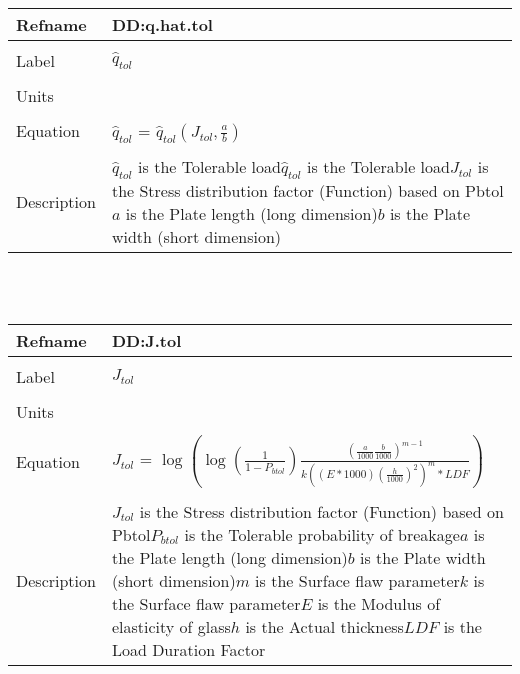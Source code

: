 \documentclass[12pt]{article}
\begin{document}
~\newline
\noindent \begin{minipage}{\textwidth}
\begin{tabular}{p{} p{}}
\toprule \textbf{Refname} & \textbf{DD:q.hat.tol}
\label{DD:q.hat.tol}
\\ \midrule \\
Label & $\hat{q}_{tol}$
\\ \midrule \\
Units & 
\\ \midrule \\
Equation & $\hat{q}_{tol}$ = $\hat{q}_{tol}(J_{tol},\frac{a}{b})$
\\ \midrule \\
Description & $\hat{q}_{tol}$ is the Tolerable load\newline$\hat{q}_{tol}$ is the Tolerable load\newline$J_{tol}$ is the Stress distribution factor (Function) based on Pbtol\newline$a$ is the Plate length (long dimension)\newline$b$ is the Plate width (short dimension)
\\ \bottomrule \end{tabular}
\end{minipage}\\
~\newline
\noindent \begin{minipage}{\textwidth}
\begin{tabular}{p{} p{}}
\toprule \textbf{Refname} & \textbf{DD:J.tol}
\label{DD:J.tol}
\\ \midrule \\
Label & $J_{tol}$
\\ \midrule \\
Units & 
\\ \midrule \\
Equation & $J_{tol}$ = $\log(\log(\frac{1}{1-P_{btol}})\frac{(\frac{a}{1000}\frac{b}{1000})^{m-1}}{k((E*1000)(\frac{h}{1000})^{2})^{m}*LDF})$
\\ \midrule \\
Description & $J_{tol}$ is the Stress distribution factor (Function) based on Pbtol\newline$P_{btol}$ is the Tolerable probability of breakage\newline$a$ is the Plate length (long dimension)\newline$b$ is the Plate width (short dimension)\newline$m$ is the Surface flaw parameter\newline$k$ is the Surface flaw parameter\newline$E$ is the Modulus of elasticity of glass\newline$h$ is the Actual thickness\newline$LDF$ is the Load Duration Factor
\\ \bottomrule \end{tabular}
\end{minipage}\\
\end{document}
